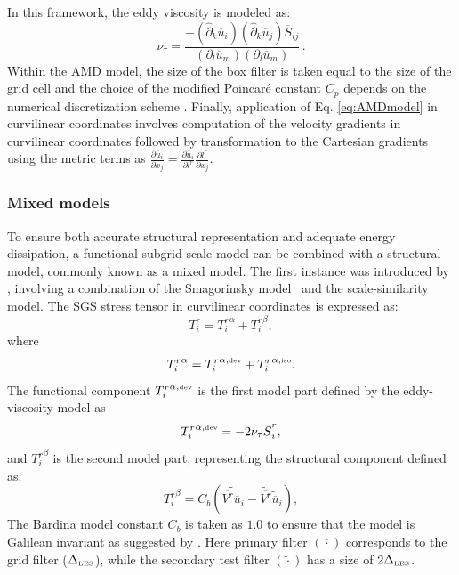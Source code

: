 \documentclass[final,3p]{elsarticle}
\begin{document}
In this framework, the eddy viscosity is modeled as:
\begin{equation}
	\nu_{\tau} = \frac{ -(\hat{\partial}_k \overline{u}_i)(\hat{\partial}_k \overline{u}_j) \overline{S}_{ij}}{(\partial_l \overline{u}_m)(\partial_l \overline{u}_m)} \, .
	\label{eq:AMDmodel}
\end{equation}
Within the AMD model, the size of the box filter is taken equal to the size of the grid cell and the choice of the modified Poincar\'e constant $C_p$ depends on the numerical discretization scheme \cite{rozema2015minimum}. Finally, application of Eq. \ref{eq:AMDmodel} in curvilinear coordinates involves computation of the velocity gradients in curvilinear coordinates followed by transformation to the Cartesian gradients using the metric terms as $\frac{\partial \overline{u}_i}{\partial x_j} = \frac{\partial \overline{u}_i}{\partial l^r} \frac{\partial l^r}{\partial x_j}$.


\subsubsection{Mixed models}

To ensure both accurate structural representation and adequate energy dissipation, a functional subgrid-scale model can be combined with a structural model, commonly known as a mixed model. The first instance was introduced by \citet{bardina1980improved}, involving a combination of the Smagorinsky model~\cite{smagorinsky1963} and the scale-similarity model. The SGS stress tensor in curvilinear coordinates is expressed as:
\begin{equation} 
	T^r_{i} = {T^r_{i}}^{\alpha} + {T^r_{i}}^{\beta}, 
	\label{eq:contributionLES2}
\end{equation} 
where 
\begin{equation} 
	{T^r_{i}}^{\alpha} = {T^r_{i}}^{\alpha, \hbox{\tiny dev}} + {T^r_{i}}^{\alpha, \hbox{\tiny iso}}. 
	\label{eq:contributionLESalpha}
\end{equation} 
The functional component ${T^r_{i}}^{\alpha, \hbox{\tiny dev}}$ is the first model part defined by the eddy-viscosity model as
\begin{equation}
	{T^r_{i}}^{\alpha, \hbox{\tiny dev}} = -2\nu_{\tau}\overline{S}^r_{i},
\end{equation}
and ${T^r_{i}}^{\beta}$ is the second model part, representing the structural component defined as:
\begin{equation}
	{T^r_i}^{\beta} = C_b \left(\widetilde{ \overline{V^r}\overline{u}_i} -\widetilde{\overline{V^r}} \tilde{\overline{u}}_i \right),
	\label{eq:bardina}
\end{equation}
The Bardina model constant $C_b$ is taken as $1.0$ to ensure that the model is Galilean invariant as suggested by \citet{speziale1985galilean}. Here primary filter $(\overline{\cdot})$ corresponds to the grid filter ($\Delta_{\hbox{\tiny LES}}$), while the secondary test filter $(\widetilde{\cdot})$ has a size of $2\Delta_{\hbox{\tiny LES}}$. 
\end{document}
